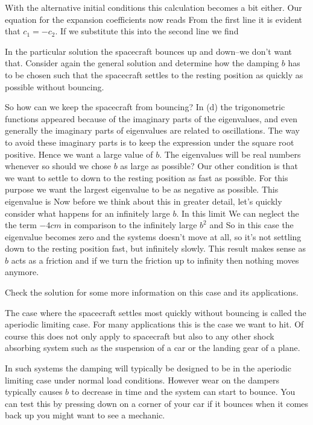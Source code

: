 With the alternative initial conditions this calculation becomes a bit either. Our equation for the expansion coefficients now reads
From the first line it is evident that $c_1=-c_2$. If we substitute this into the second line we find 

\subquestion
In the particular solution the spacecraft bounces up and down--we don't want that. Consider again the general solution and determine how the damping $b$ has to be chosen such that the spacecraft settles to the resting position as quickly as possible without bouncing. 

\solution 
So how can we keep the spacecraft from bouncing? In (d) the trigonometric functions appeared because of the imaginary parts of the eigenvalues, and even generally the imaginary parts of eigenvalues are related to oscillations. The way to avoid these imaginary parts is to keep the expression under the square root positive. Hence we want a large value of $b$. The eigenvalues will be real numbers whenever 
so should we chose $b$ as large as possible? Our other condition is that we want to settle to down to the resting position as fast as possible. For this purpose we want the largest eigenvalue to be as negative as possible. This eigenvalue is 
Now before we think about this in greater detail, let's quickly consider what happens for an infinitely large $b$. In this limit We can neglect the 
the term $-4cm$ in comparison to the infinitely large $b^2$ and 
So in this case the eigenvalue becomes zero and the systems doesn't move at all, so it's not settling down to the resting position fast, but infinitely slowly. This result makes sense as $b$ acts as a friction and if we turn the friction up to infinity then nothing moves anymore. 

\subquestion 
Check the solution for some more information on this case and its applications.

\solution 
The case where the spacecraft settles most quickly without bouncing is called the aperiodic limiting case. For many applications this is the case we want to hit. Of course this does not only apply to spacecraft but also to any other shock absorbing system such as the suspension of a car or the landing gear of a plane. 

In such systems the damping will typically be designed to be in the aperiodic limiting case under normal load conditions. However wear on the dampers typically causes $b$ to decrease in time and the system can start to bounce. You can test this by pressing down on a corner of your car if it bounces when it comes back up you might want to see a mechanic. 

